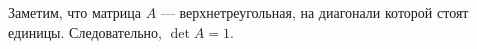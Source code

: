 \documentclass{article}
\begin{document}
Заметим, что матрица $A$ --- верхнетреугольная, на диагонали которой стоят единицы. Следовательно, $\det A = 1$.
\end{document}
